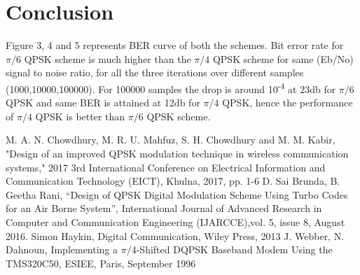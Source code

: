 \documentclass[conference]{IEEEtran}
\begin{document}
\section{Conclusion}

Figure 3, 4 and 5 represents BER curve of both the schemes. Bit error rate for $\pi/6$ QPSK scheme is much higher than the  $\pi/4$ QPSK scheme for same (Eb/No) signal to noise ratio, for all the three iterations over different samples (1000,10000,100000). For 100000 samples the drop is around 10\textsuperscript{-4} at 23db  for $\pi/6$ QPSK and   same BER is attained at 12db for $\pi/4$ QPSK, hence the performance of $\pi/4$ QPSK is better than $\pi/6$ QPSK scheme.


\begin{thebibliography}{00}
M. A. N. Chowdhury, M. R. U. Mahfuz, S. H. Chowdhury and M. M. Kabir, "Design of an improved QPSK modulation technique in wireless communication systems," 2017 3rd International Conference on Electrical Information and Communication Technology (EICT), Khulna, 2017, pp. 1-6
 D. Sai Brunda, B. Geetha Rani, “Design of QPSK Digital Modulation
Scheme Using Turbo Codes for an Air Borne System”, International
Journal of Advanced Research in Computer and Communication
Engineering (IJARCCE),vol. 5, issue 8, August 2016.
Simon Haykin, Digital Communication, Wiley Press, 2013
J. Webber, N. Dahnoun, Implementing a $\pi/4$-Shifted DQPSK Baseband
Modem Using the TMS320C50, ESIEE, Paris, September 1996

\end{thebibliography}
\end{document}
